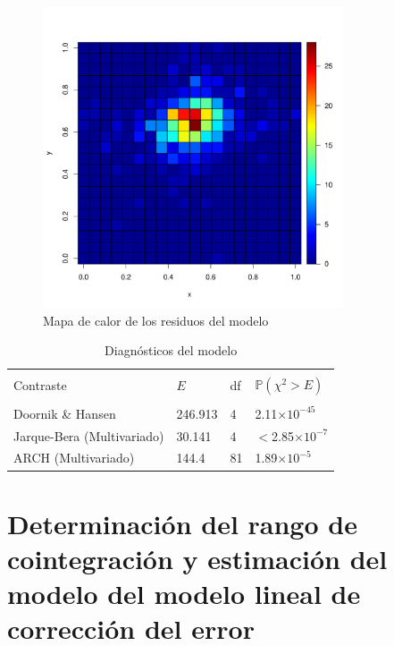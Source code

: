 \documentclass[12pt, twoside]{book}\usepackage[]{graphicx}\usepackage[]{color}
\newenvironment{knitrout}{}{} %
\numberwithin{equation}{section}
\numberwithin{theorem}{section}
\numberwithin{teorema}{section}
\numberwithin{defi}{section}
\numberwithin{prop}{section}
\numberwithin{defi}{section}
\theoremstyle{plain}
\begin{document}
\begin{knitrout}
\color{fgcolor}\begin{figure}[H]

{\centering \includegraphics[width=3.5in,height=3.5in]{figure/fig-5_3_2-1} 

}

\caption[Mapa de calor de los residuos del modelo]{Mapa de calor de los residuos del modelo}\label{fig:fig-5.3.2}
\end{figure}


\end{knitrout}




\begin{table}[h]
\centering
\caption{Diagnósticos del modelo}
\begin{tabular}{@{}llll@{}}
\toprule \\ 
Contraste   & $E$ & df & $\mathbb{P}(\chi^{2}>E)$ \\
\midrule \\ 
Doornik \& Hansen & 246.913 & 4 & 2.11$\times 10^{-45}$ \\
Jarque-Bera (Multivariado) & 30.141 & 4 & $<$2.85$\times 10^{-7}$ \\
ARCH (Multivariado) & 144.4 & 81 & 1.89$\times 10^{-5}$ \\ 
\bottomrule 
\end{tabular}
\end{table}

\section{Determinación del rango de cointegración y estimación del modelo del modelo lineal de corrección del error}
\end{document}

